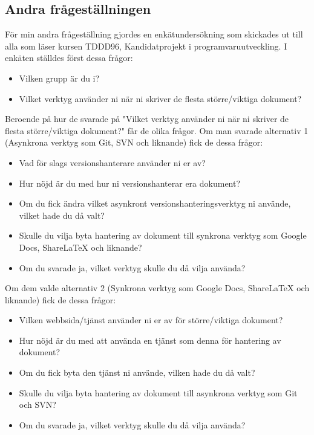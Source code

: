 \subsection{Andra frågeställningen}
För min andra frågeställning gjordes en enkätundersökning som skickades ut till alla som läser kursen TDDD96, Kandidatprojekt i programvaruutveckling. I enkäten ställdes först dessa frågor:
\begin{itemize}
	\item Vilken grupp är du i?
	\item Vilket verktyg använder ni när ni skriver de flesta större/viktiga dokument?
\end{itemize}

Beroende på hur de svarade på "Vilket verktyg använder ni när ni skriver de flesta större/viktiga dokument?" får de olika frågor. Om man svarade alternativ 1 (Asynkrona verktyg som Git, SVN och liknande) fick de dessa frågor:

\begin{itemize}
	\item Vad för slags versionshanterare använder ni er av?
	\item Hur nöjd är du med hur ni versionshanterar era dokument?
	\item Om du fick ändra vilket asynkront versionshanteringsverktyg ni använde, vilket hade du då valt?
	\item Skulle du vilja byta hantering av dokument till synkrona verktyg som Google Docs, ShareLaTeX och liknande?
	\item Om du svarade ja, vilket verktyg skulle du då vilja använda?
\end{itemize}

Om dem valde alternativ 2 (Synkrona verktyg som Google Docs, ShareLaTeX och liknande) fick de dessa frågor:

\begin{itemize}
	\item Vilken webbsida/tjänst använder ni er av för större/viktiga dokument?
	\item Hur nöjd är du med att använda en tjänst som denna för hantering av dokument?
	\item Om du fick byta den tjänst ni använde, vilken hade du då valt?
	\item Skulle du vilja byta hantering av dokument till asynkrona verktyg som Git och SVN?
	\item Om du svarade ja, vilket verktyg skulle du då vilja använda?
\end{itemize}

